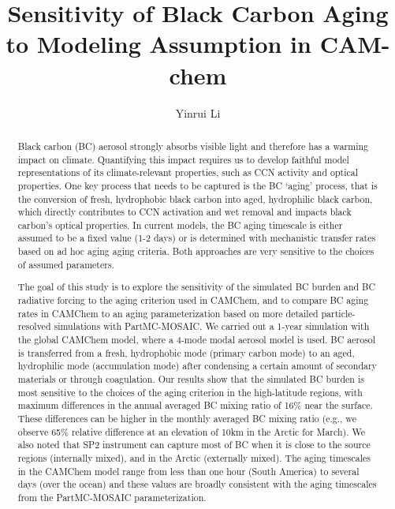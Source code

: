 \documentclass[12pt, fullpage]{uiucthesis2009}
\title{Sensitivity of Black Carbon Aging to Modeling Assumption in CAM-chem}
\author{Yinrui Li}
\begin{document}
\maketitle

\frontmatter

\begin{abstract}
Black carbon (BC) aerosol strongly absorbs visible light and therefore has a warming impact on climate. Quantifying this impact requires us to develop faithful model representations of its climate-relevant properties, such as CCN activity and optical properties. One key process that needs to be captured is the BC ‘aging’ process, that is the conversion of fresh, hydrophobic black carbon into aged, hydrophilic black carbon, which directly contributes to CCN activation and wet removal and impacts black carbon’s optical properties. In current models, the BC aging timescale is either assumed to be a fixed value (1-2 days) or is determined with mechanistic transfer rates based on ad hoc aging aging criteria. Both approaches are very sensitive to the choices of assumed parameters. 

The goal of this study is to explore the sensitivity of the simulated BC burden and BC radiative forcing to the aging criterion used in CAMChem, and to compare BC aging rates in CAMChem to an aging parameterization based on more detailed particle-resolved simulations with PartMC-MOSAIC. We carried out a 1-year simulation with the global CAMChem model, where a 4-mode modal aerosol model is used. BC aerosol is transferred from a fresh, hydrophobic mode (primary carbon mode) to an aged, hydrophilic mode (accumulation mode) after condensing a certain amount of secondary materials or through coagulation. Our results show that the simulated BC burden is most sensitive to the choices of the aging criterion in the high-latitude regions, with maximum differences in the annual averaged BC mixing ratio of 16$\%$ near the surface. These differences can be higher in the monthly averaged BC mixing ratio (e.g., we observe 65$\%$ relative difference at an elevation of 10km in the Arctic for March). We also noted that SP2 instrument can capture most of BC when it is close to the source regions (internally mixed), and in the Arctic (externally mixed). The aging timescales in the CAMChem model range from less than one hour (South America) to several days (over the ocean) and these values are broadly consistent with the aging timescales from the PartMC-MOSAIC parameterization.


\end{abstract}
\end{document}
